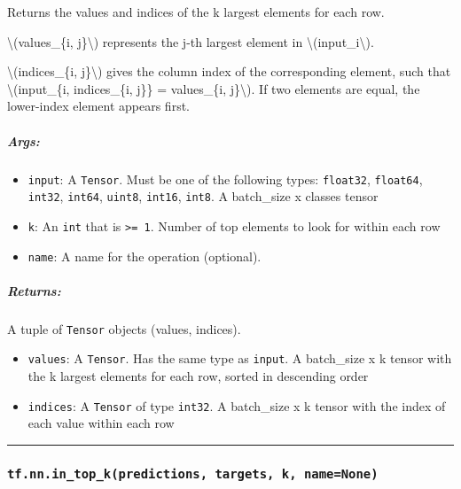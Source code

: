 Returns the values and indices of the k largest elements for each row.

\textbackslash{}(values\_\{i, j\}\textbackslash{}) represents the j-th
largest element in \textbackslash{}(input\_i\textbackslash{}).

\textbackslash{}(indices\_\{i, j\}\textbackslash{}) gives the column
index of the corresponding element, such that
\textbackslash{}(input\_\{i, indices\_\{i, j\}\} = values\_\{i,
j\}\textbackslash{}). If two elements are equal, the lower-index element
appears first.

\subparagraph{Args: }\label{args-21}

\begin{itemize}
\tightlist
\item
  \texttt{input}: A \texttt{Tensor}. Must be one of the following types:
  \texttt{float32}, \texttt{float64}, \texttt{int32}, \texttt{int64},
  \texttt{uint8}, \texttt{int16}, \texttt{int8}. A batch\_size x classes
  tensor
\item
  \texttt{k}: An \texttt{int} that is \texttt{\textgreater{}=\ 1}.
  Number of top elements to look for within each row
\item
  \texttt{name}: A name for the operation (optional).
\end{itemize}

\subparagraph{Returns: }\label{returns-21}

A tuple of \texttt{Tensor} objects (values, indices).

\begin{itemize}
\tightlist
\item
  \texttt{values}: A \texttt{Tensor}. Has the same type as
  \texttt{input}. A batch\_size x k tensor with the k largest elements
  for each row, sorted in descending order
\item
  \texttt{indices}: A \texttt{Tensor} of type \texttt{int32}. A
  batch\_size x k tensor with the index of each value within each row
\end{itemize}

\begin{center}\rule{0.5\linewidth}{\linethickness}\end{center}

\subsubsection{\texorpdfstring{\texttt{tf.nn.in\_top\_k(predictions,\ targets,\ k,\ name=None)}
}{tf.nn.in\_top\_k(predictions, targets, k, name=None) }}\label{tf.nn.inux5ftopux5fkpredictions-targets-k-namenone}

